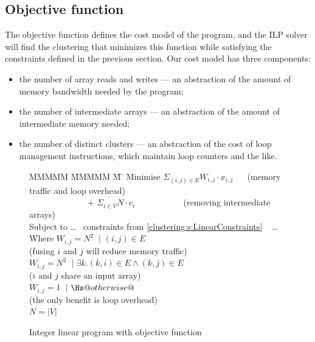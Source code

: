 \subsection{Objective function}
\label{clustering:s:ObjectiveFunction}
The objective function defines the cost model of the program, and the ILP solver will find the clustering that minimizes this function while satisfying the constraints defined in the previous section.
Our cost model has three components:
\begin{itemize}
\item
the number of array reads and writes --- an abstraction of the amount of memory bandwidth needed by the program; 
\item
the number of intermediate arrays --- an abstraction of the amount of intermediate memory needed; 
\item
the number of distinct clusters --- an abstraction of the cost of loop management instructions, which maintain loop counters and the like.
\end{itemize}

\begin{figure}
\begin{tabbing}
MMMMM   \= MMMMM \= M \= \kill
Minimise   \>     $\Sigma_{(i,j) \in E} W_{i,j} \cdot x_{i,j}$   
                        ~~ (memory traffic and loop overhead)
\\ ~~~~~~~~~~~~~ $+$ \> $\Sigma_{i \in V} N \cdot c_i$
                        ~~~~~~~~~~ (removing intermediate arrays)
\\[1ex]
   Subject to  \> \ldots ~ constraints from \cref{clustering:s:LinearConstraints} ~ \ldots 
\\ Where   \> $W_{i,j} = N^2$ \> $~|$ \> $(i,j) \in E $         
\\         \> \> \> (fusing $i$ and $j$ will reduce memory traffic)         
\\         \> $W_{i,j} = N^2$ \> $~|$ \> $\exists k. (k,i) \in E \wedge (k,j) \in E $     
\\         \> \> \> ($i$ and $j$ share an input array)
\\         \> $W_{i,j} = 1$   \> $~|$ \> $\Hs@otherwise@$
\\         \> \> \> (the only benefit is loop overhead)
\\         \> $N = |V|$
\end{tabbing}
\caption{Integer linear program with objective function}
\label{fig:clustering:ilp-obj}
\end{figure}

